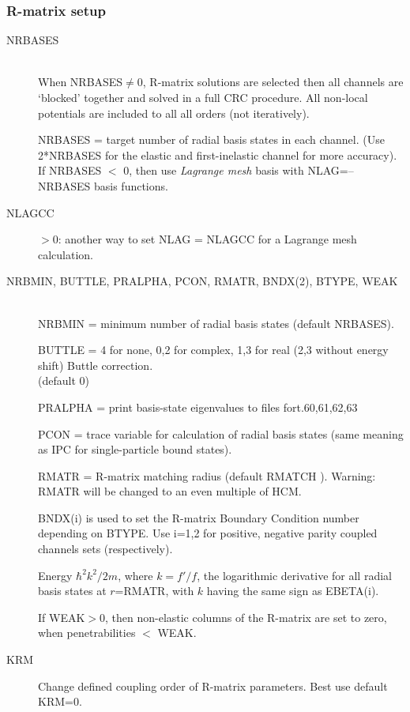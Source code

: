 \documentclass[11pt]{article}
\begin{document}
\subsubsection{R-matrix setup}
\begin{description}

\item[NRBASES] ~\\
When NRBASES$\neq$0, R-matrix solutions are selected then all channels
are `blocked' together and solved in a full CRC procedure. All non-local potentials are included to all all orders (not iteratively).

NRBASES = target number of radial basis states in each channel.
(Use 2*NRBASES for the elastic and first-inelastic channel for more accuracy).\\
If NRBASES $<$ 0, then use {\em Lagrange mesh} basis with NLAG=--NRBASES basis functions.

\item[NLAGCC] $>0$: another way to set NLAG = NLAGCC for a Lagrange mesh calculation.

\item[NRBMIN, BUTTLE, PRALPHA, PCON, RMATR, BNDX(2), BTYPE, WEAK] ~\\
NRBMIN = minimum number of radial basis states (default NRBASES).

BUTTLE = 4 for none, 0,2 for complex, 1,3 for real
(2,3 without energy shift) Buttle correction.\\
(default 0)

PRALPHA = print basis-state eigenvalues to files fort.60,61,62,63

PCON = trace variable for calculation of radial basis states (same
meaning as IPC for single-particle bound states).


RMATR = R-matrix matching radius (default RMATCH ).
Warning: RMATR will be changed to an even multiple of HCM.

BNDX(i) is used to set the R-matrix Boundary Condition number depending on BTYPE.
Use i=1,2 for positive, negative parity coupled channels sets (respectively).

Energy $\hbar^2k^2/2m$, where $k= f'/f$, the logarithmic derivative
for all radial basis states at $r$=RMATR, with $k$ having the same
sign as EBETA(i). 

If WEAK$>$0, then non-elastic columns of the R-matrix are set to zero,
  when penetrabilities $<$ WEAK.
  
\item[KRM]
Change defined coupling order of R-matrix parameters. Best use default KRM=0.
 

\end{description}
\end{document}
